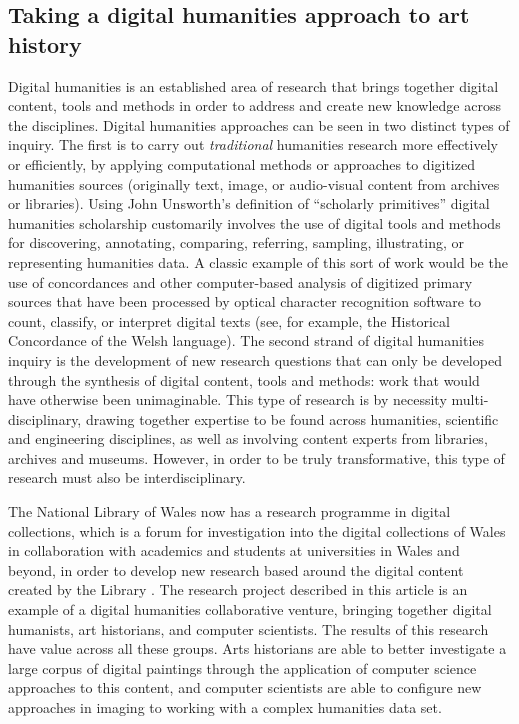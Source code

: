 \subsection{Taking a digital humanities approach to art history}

Digital humanities is an established area of research that brings together
digital content, tools and methods in order to address and create new knowledge
across the disciplines. Digital humanities approaches can be seen in two
distinct types of inquiry. The first is to carry out \emph{traditional}
humanities research more effectively or efficiently, by applying computational
methods or approaches to digitized humanities sources (originally text, image,
or audio-visual content from archives or libraries). Using John Unsworth’s
definition of ``scholarly primitives''\cite{Unsworth2000Scholarly} digital humanities
scholarship customarily involves the use of digital tools and methods for
discovering, annotating, comparing, referring, sampling, illustrating, or
representing humanities data. A classic example of this sort of work would be
the use of concordances and other computer-based analysis of digitized primary
sources that have been processed by optical character recognition software to
count, classify, or interpret digital texts (see, for example, the Historical
Concordance of the Welsh language\cite{2004Corpws}).  The second strand
of digital humanities inquiry is the development of new research questions that
can only be developed through the synthesis of digital content, tools and
methods: work that would have otherwise been unimaginable\cite{Hughes2011Evaluating}. This
type of research is by necessity multi-disciplinary, drawing together expertise
to be found across humanities, scientific and engineering disciplines, as well
as involving content experts from libraries, archives and museums. However, in
order to be truly transformative, this type of research must also be
interdisciplinary. 

The National Library of Wales now has a research programme in digital
collections, which is a forum for investigation into the digital collections of
Wales in collaboration with academics and students at universities in Wales and
beyond, in order to develop new research based around the digital content
created by the Library \cite{2012Research}. The research project described in this
article is an example of a digital humanities collaborative venture, bringing
together digital humanists, art historians, and computer scientists.  The
results of this research have value across all these groups. Arts historians
are able to better investigate a large corpus of digital paintings through the
application of computer science approaches to this content, and computer
scientists are able to configure new approaches in imaging to working with a
complex humanities data set.

